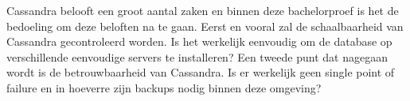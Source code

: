 
Cassandra belooft een groot aantal zaken en binnen deze bachelorproef is het de bedoeling om deze beloften na te gaan.
Eerst en vooral zal de schaalbaarheid van Cassandra gecontroleerd worden.
Is het werkelijk eenvoudig om de database op verschillende eenvoudige servers te installeren?
Een tweede punt dat nagegaan wordt is de betrouwbaarheid van Cassandra.
Is er werkelijk geen single point of failure en in hoeverre zijn backups nodig binnen deze omgeving?